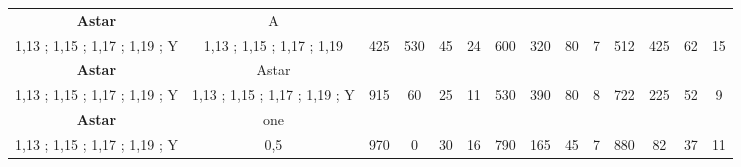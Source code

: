 \begin{table}[]
{\begin{tabular}{|c|c|c|c|c|c|c|c|c|c|c|c|c|c|}
\cellcolor{blue!15}\textbf{Astar} & A& {\color[HTML]{00009B} } & {\color[HTML]{9A0000} } & {\color[HTML]{009901} } &  & {\color[HTML]{00009B} } & {\color[HTML]{9A0000} } & {\color[HTML]{009901} } &  & {\color[HTML]{00009B} } & {\color[HTML]{9A0000} } & {\color[HTML]{009901} } &  \\ 
\cellcolor{ blue!15}1,13 ; 1,15 ; 1,17 ; 1,19 ; Y & 1,13 ; 1,15 ; 1,17 ; 1,19 & \multirow{-2}{*}{{\color[HTML]{00009B} 425}} & \multirow{-2}{*}{{\color[HTML]{9A0000} 530}} & \multirow{-2}{*}{{\color[HTML]{009901} 45}} & \multirow{-2}{*}{24} & \multirow{-2}{*}{{\color[HTML]{00009B} 600}} & \multirow{-2}{*}{{\color[HTML]{9A0000} 320}} & \multirow{-2}{*}{{\color[HTML]{009901} 80}} & \multirow{-2}{*}{7} & \multirow{-2}{*}{{\color[HTML]{00009B} 512}} & \multirow{-2}{*}{{\color[HTML]{9A0000} 425}} & \multirow{-2}{*}{{\color[HTML]{009901} 62}} & \multirow{-2}{*}{15} \\ \hline

\cellcolor{blue!15}\textbf{Astar} & Astar& {\color[HTML]{00009B} } & {\color[HTML]{9A0000} } & {\color[HTML]{009901} } &  & {\color[HTML]{00009B} } & {\color[HTML]{9A0000} } & {\color[HTML]{009901} } &  & {\color[HTML]{00009B} } & {\color[HTML]{9A0000} } & {\color[HTML]{009901} } &  \\ 
\cellcolor{ blue!15}1,13 ; 1,15 ; 1,17 ; 1,19 ; Y & 1,13 ; 1,15 ; 1,17 ; 1,19 ; Y & \multirow{-2}{*}{{\color[HTML]{00009B} 915}} & \multirow{-2}{*}{{\color[HTML]{9A0000} 60}} & \multirow{-2}{*}{{\color[HTML]{009901} 25}} & \multirow{-2}{*}{11} & \multirow{-2}{*}{{\color[HTML]{00009B} 530}} & \multirow{-2}{*}{{\color[HTML]{9A0000} 390}} & \multirow{-2}{*}{{\color[HTML]{009901} 80}} & \multirow{-2}{*}{8} & \multirow{-2}{*}{{\color[HTML]{00009B} 722}} & \multirow{-2}{*}{{\color[HTML]{9A0000} 225}} & \multirow{-2}{*}{{\color[HTML]{009901} 52}} & \multirow{-2}{*}{9} \\ \hline

\cellcolor{blue!15}\textbf{Astar} & one& {\color[HTML]{00009B} } & {\color[HTML]{9A0000} } & {\color[HTML]{009901} } &  & {\color[HTML]{00009B} } & {\color[HTML]{9A0000} } & {\color[HTML]{009901} } &  & {\color[HTML]{00009B} } & {\color[HTML]{9A0000} } & {\color[HTML]{009901} } &  \\ 
\cellcolor{ blue!15}1,13 ; 1,15 ; 1,17 ; 1,19 ; Y & 0,5 & \multirow{-2}{*}{{\color[HTML]{00009B} 970}} & \multirow{-2}{*}{{\color[HTML]{9A0000} 0}} & \multirow{-2}{*}{{\color[HTML]{009901} 30}} & \multirow{-2}{*}{16} & \multirow{-2}{*}{{\color[HTML]{00009B} 790}} & \multirow{-2}{*}{{\color[HTML]{9A0000} 165}} & \multirow{-2}{*}{{\color[HTML]{009901} 45}} & \multirow{-2}{*}{7} & \multirow{-2}{*}{{\color[HTML]{00009B} 880}} & \multirow{-2}{*}{{\color[HTML]{9A0000} 82}} & \multirow{-2}{*}{{\color[HTML]{009901} 37}} & \multirow{-2}{*}{11} \\ \hline


\end{tabular}}
\end{table}
